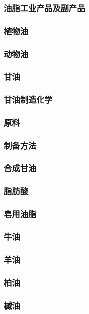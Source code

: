 \documentclass[UTF8]{../../ApplicationUniverse}
\begin{document}
\subsubsection{油脂工业产品及副产品}
    \subsubsection{植物油}
    \subsubsection{动物油}
    \subsubsection{甘油}
        \subsubsection{甘油制造化学}
        \subsubsection{原料}
        \subsubsection{制备方法}
        \subsubsection{合成甘油}
    \subsubsection{脂肪酸}
    \subsubsection{皂用油脂}
        \subsubsection{牛油}
        \subsubsection{羊油}
        \subsubsection{柏油}
        \subsubsection{槭油}
\end{document}
